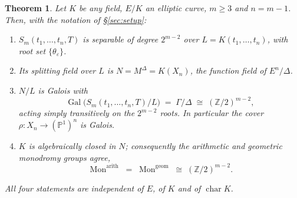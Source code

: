 \documentclass[11pt,a4paper]{article}
\theoremstyle{plain}
\newtheorem{theorem}{Theorem}[section]
\theoremstyle{definition}
\DeclareMathOperator{\Gal}{Gal}
\DeclareMathOperator{\Mon}{Mon}
\newcommand{\PP}{\mathbb{P}}
\newcommand{\ZZ}{\mathbb{Z}}
\newcommand{\eps}{\varepsilon}
\begin{document}
\begin{theorem}\label{thm:main}
Let $K$ be any field, $E/K$ an elliptic curve, $m \ge 3$ and $n = m-1$. Then, with
the notation of \S\ref{sec:setup}:
\begin{enumerate}
\item $S_m(t_1,\dots,t_n,T)$ is separable of degree $2^{m-2}$ over
  $L = K(t_1,\dots,t_n)$, with root set $\{ \theta_{\eps} \}$.
\item Its splitting field over $L$ is $N = M^{\Delta} = K(X_n)$, the function
  field of $E^{n}/\Delta$.
\item $N/L$ is Galois with
  \[
    \Gal\bigl( S_m(t_1,\dots,t_n,T) / L \bigr) \;=\; \Gamma/\Delta
      \;\cong\; (\ZZ/2)^{m-2},
  \]
  acting simply transitively on the $2^{m-2}$ roots. In particular the cover
  $\rho \colon X_n \to (\PP^1)^n$ is Galois.
\item $K$ is algebraically closed in $N$; consequently the arithmetic and
  geometric monodromy groups agree,
  \[
    \Mon^{\mathrm{arith}} \;=\; \Mon^{\mathrm{geom}} \;\cong\; (\ZZ/2)^{m-2}.
  \]
\end{enumerate}
All four statements are independent of $E$, of $K$ and of $\operatorname{char} K$.
\end{theorem}
\end{document}
